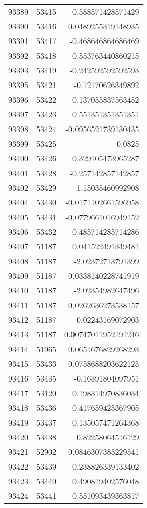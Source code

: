 \begin{tabular}{r | r | r}
93389 & 53415 & -0.588571428571429 \\
93390 & 53416 & 0.0489255319148935 \\
93391 & 53417 & -0.468646864686469 \\
93392 & 53418 & 0.553763440860215 \\
93393 & 53419 & -0.242592592592593 \\
93395 & 53421 & -0.12170626349892 \\
93396 & 53422 & -0.137055837563452 \\
93397 & 53423 & 0.551351351351351 \\
93398 & 53424 & -0.0956521739130435 \\
93399 & 53425 & -0.0825 \\
93400 & 53426 & 0.329105473965287 \\
93401 & 53428 & -0.257142857142857 \\
93402 & 53429 & 1.15035460992908 \\
93404 & 53430 & -0.0171102661596958 \\
93405 & 53431 & -0.0779661016949152 \\
93406 & 53432 & 0.485714285714286 \\
93407 & 51187 & 0.041522491349481 \\
93408 & 51187 & -2.02372713791399 \\
93409 & 51187 & 0.0338140228741919 \\
93410 & 51187 & -2.02354982647496 \\
93411 & 51187 & 0.0262636273538157 \\
93412 & 51187 & 0.02243169072903 \\
93413 & 51187 & 0.00747011952191246 \\
93414 & 51965 & 0.0651676829268293 \\
93415 & 53433 & 0.0758688203622125 \\
93416 & 53435 & -0.16391804097951 \\
93417 & 53120 & 0.198314970836034 \\
93418 & 53436 & 0.417659425367905 \\
93419 & 53437 & -0.135057471264368 \\
93420 & 53438 & 0.82258064516129 \\
93421 & 52902 & 0.0846307385229541 \\
93422 & 53439 & 0.238826339133402 \\
93423 & 53440 & 0.490819402576048 \\
93424 & 53441 & 0.551093439363817 \\

\end{tabular}
